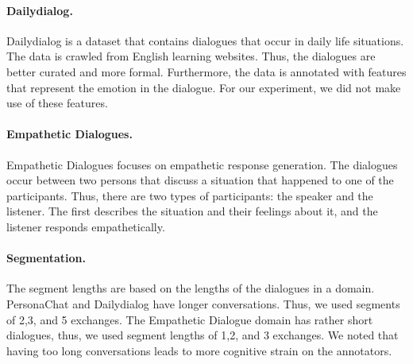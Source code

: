 \documentclass[11pt,a4paper]{article}
\begin{document}
\paragraph{Dailydialog.} Dailydialog \cite{li-etal-2017-dailydialog} is a dataset that contains dialogues that occur in daily life situations. The data is crawled from English learning websites. Thus, the dialogues are better curated and more formal. Furthermore, the data is annotated with features that represent the emotion in the dialogue. For our experiment, we did not make use of these features. 
\paragraph{Empathetic Dialogues.} Empathetic Dialogues \cite{rashkin-etal-2019-towards} focuses on empathetic response generation. The dialogues occur between two persons that discuss a situation that happened to one of the participants. Thus, there are two types of participants: the speaker and the listener. The first describes the situation and their feelings about it, and the listener responds empathetically. 

\paragraph{Segmentation.} The segment lengths are based on the lengths of the dialogues in a domain. PersonaChat and Dailydialog have longer conversations. Thus, we used segments of 2,3, and 5 exchanges. The Empathetic Dialogue domain has rather short dialogues, thus, we used segment lengths of 1,2, and 3 exchanges. We noted that having too long conversations leads to more cognitive strain on the annotators. 
\end{document}
